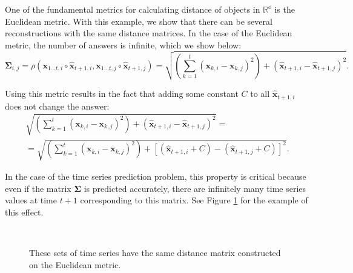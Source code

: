\documentclass[12pt]{article}
\begin{document}
One of the fundamental metrics for calculating distance of objects in $\mathbb{R^d}$ is the Euclidean metric. With this example, we show that there can be several reconstructions with the same distance matrices. In the case of the Euclidean metric, the number of answers is infinite, which we show below:
\[\mathbf{\Sigma}_{i,j} = \rho(\mathbf{x}_{1 \ldots t, i} \circ \hat{\mathbf{x}}_{t+1, i}, \mathbf{x}_{1 \ldots t, j} \circ \hat{\mathbf{x}}_{t+1, j})=\sqrt{\left(\sum_{k=1}^t (\mathbf{x}_{k,i}-\mathbf{x}_{k,j})^2\right) + (\hat{\mathbf{x}}_{t+1, i}-\hat{\mathbf{x}}_{t+1, j})^2}.\]

Using this metric results in the fact that adding some constant $C$ to all $\hat{\mathbf{x}}_{t+1, i}$ does not change the answer:
\begin{gather*}
	\sqrt{\left(\sum_{k=1}^t (\mathbf{x}_{k,i}-\mathbf{x}_{k,j})^2\right) + (\hat{\mathbf{x}}_{t+1, i}-\hat{\mathbf{x}}_{t+1, j})^2} =\\
	= \sqrt{\left(\sum_{k=1}^t (\mathbf{x}_{k,i}-\mathbf{x}_{k,j})^2\right) + [(\hat{\mathbf{x}}_{t+1, i} + C) -(\hat{\mathbf{x}}_{t+1, j} + C)]^2}.
\end{gather*}

In the case of the time series prediction problem, this property is critical because even if the matrix $\mathbf{\Sigma}$ is predicted accurately, there are infinitely many time series values at time $t+1$ corresponding to this matrix. See Figure \ref{fig:fig1} for the example of this effect.
\begin{figure}[!htbp]
	\centering
	\\
	\caption{These sets of time series have the same distance matrix constructed on the Euclidean metric.}
	\label{fig:fig1}
\end{figure}
\end{document}
